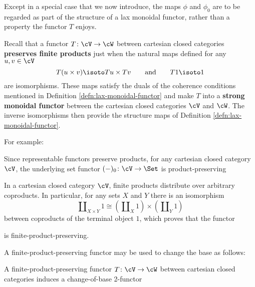 Except in a special case that we now introduce, the maps $\phi$ and $\phi_0$ are to be regarded as part of the structure of a lax monoidal functor, rather than a property the functor $T$ enjoys.

Recall that a functor $T \colon \cV \to \cW$ between cartesian closed categories \textbf{preserves finite products} just when the natural maps defined for any $u,v \in \cV$
\[ T(u \times v) \isoto Tu \times Tv \qquad \text{and} \qquad T1 \isoto 1\]
are isomorphisms. These maps satisfy the duals of the coherence conditions mentioned in Definition \ref{defn:lax-monoidal-functor} and  make $T$ into a \textbf{strong monoidal functor} between the cartesian closed categories $\cV$ and $\cW$. The inverse isomorphisms then provide the structure maps of Definition \ref{defn:lax-monoidal-functor}. %

For example:


\begin{ex}\label{ex:lax-u-set} Since representable functors preserve products, for any cartesian closed category $\cV$, the underlying set functor $(-)_0 \colon \cV \to \Set$ is product-preserving
\end{ex}

\begin{ex}\label{ex:strong-free} In a cartesian closed category $\cV$, finite products distribute over arbitrary coproducts. In particular, for any sets $X$ and $Y$ there is an isomorphism
\[ \amalg_{X \times Y} 1 \cong (\amalg_X 1) \times (\amalg_Y 1)\] between coproducts of the terminal object $1$, which proves that the functor
\begin{center}
\end{center} is finite-product-preserving.
\end{ex}

A finite-product-preserving functor may be used to change the base as follows:

\begin{proposition}\label{prop:change-of-base}
  \leanok
  A finite-product-preserving functor $T \colon \cV \to \cW$ between cartesian closed categories induces a change-of-base 2-functor \begin{center} \end{center}
\end{proposition}

